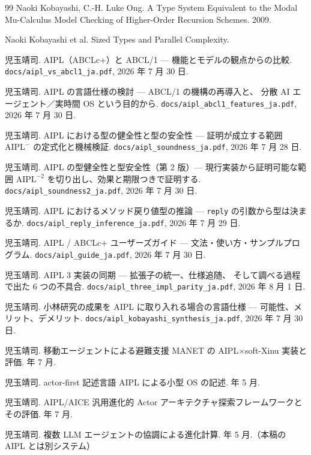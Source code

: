 \documentclass[11pt,a4paper]{ltjsarticle}
\theoremstyle{definition}
\theoremstyle{remark}
\begin{document}
\begin{thebibliography}{99}
Naoki Kobayashi, C.-H. Luke Ong.
\newblock A Type System Equivalent to the Modal Mu-Calculus Model Checking
of Higher-Order Recursion Schemes. 2009.

Naoki Kobayashi et al.
\newblock Sized Types and Parallel Complexity.

児玉靖司.
\newblock AIPL（ABCLc+）と ABCL/1 --- 機能とモデルの観点からの比較.
\newblock \texttt{docs/aipl\_vs\_abcl1\_ja.pdf}, 2026 年 7 月 30 日.

児玉靖司.
\newblock AIPL の言語仕様の検討 --- ABCL/1 の機構の再導入と、
分散 AI エージェント／実時間 OS という目的から.
\newblock \texttt{docs/aipl\_abcl1\_features\_ja.pdf}, 2026 年 7 月 30 日.

児玉靖司.
\newblock AIPL における型の健全性と型の安全性 --- 証明が成立する範囲
$\mathrm{AIPL}^-$ の定式化と機械検証.
\newblock \texttt{docs/aipl\_soundness\_ja.pdf}, 2026 年 7 月 28 日.

児玉靖司.
\newblock AIPL の型健全性と型安全性（第 2 版）--- 現行実装から証明可能な範囲
$\mathrm{AIPL}^{-2}$ を切り出し、効果と期限つきで証明する.
\newblock \texttt{docs/aipl\_soundness2\_ja.pdf}, 2026 年 7 月 30 日.

児玉靖司.
\newblock AIPL におけるメソッド戻り値型の推論 --- \texttt{reply} の引数から型は決まるか.
\newblock \texttt{docs/aipl\_reply\_inference\_ja.pdf}, 2026 年 7 月 29 日.

児玉靖司.
\newblock AIPL / ABCLc+ ユーザーズガイド --- 文法・使い方・サンプルプログラム.
\newblock \texttt{docs/aipl\_guide\_ja.pdf}, 2026 年 7 月 30 日.

児玉靖司.
\newblock AIPL 3 実装の同期 --- 拡張子の統一、仕様追随、
そして調べる過程で出た 6 つの不具合.
\newblock \texttt{docs/aipl\_three\_impl\_parity\_ja.pdf}, 2026 年 8 月 1 日.

児玉靖司.
\newblock 小林研究の成果を AIPL に取り入れる場合の言語仕様 ---
可能性、メリット、デメリット.
\newblock \texttt{docs/aipl\_kobayashi\_synthesis\_ja.pdf}, 2026 年 7 月 30 日.

児玉靖司.
\newblock 移動エージェントによる避難支援 MANET の AIPL$\times$soft-Xinu 実装と評価.
 年 7 月.

児玉靖司.
\newblock actor-first 記述言語 AIPL による小型 OS の記述.
 年 5 月.

児玉靖司.
\newblock AIPL/AICE 汎用進化的 Actor アーキテクチャ探索フレームワークとその評価.
 年 7 月.

児玉靖司.
\newblock 複数 LLM エージェントの協調による進化計算.
 年 5 月.（本稿の AIPL とは別システム）

\end{thebibliography}
\end{document}
